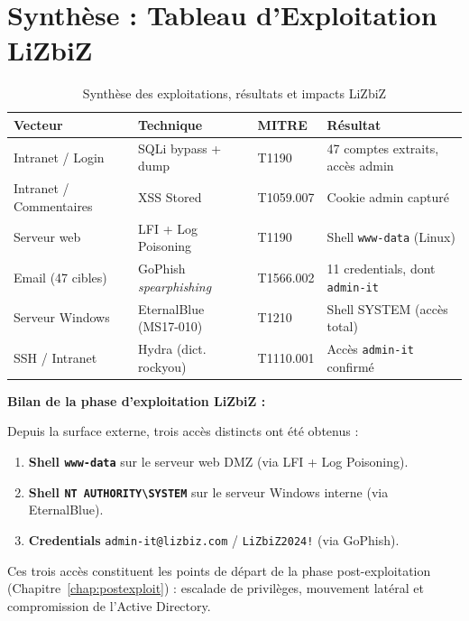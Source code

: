 \section{Synthèse : Tableau d'Exploitation LiZbiZ}
\label{sec:synthese_exploit}

\begin{table}[htbp]
\centering
\caption{Synthèse des exploitations, résultats et impacts LiZbiZ}
\label{tab:synthese_exploit}
\begin{tabular}{p{2.5cm}p{3cm}p{3cm}p{4.5cm}}
\toprule
\textbf{Vecteur} & \textbf{Technique} & \textbf{MITRE} & \textbf{Résultat} \\
\midrule
Intranet / Login
    & SQLi bypass + dump
    & T1190
    & 47 comptes extraits, accès admin \\
\addlinespace
Intranet / Commentaires
    & XSS Stored
    & T1059.007
    & Cookie admin capturé \\
\addlinespace
Serveur web
    & LFI + Log Poisoning
    & T1190
    & Shell \texttt{www-data} (Linux) \\
\addlinespace
Email (47 cibles)
    & GoPhish \textit{spearphishing}
    & T1566.002
    & 11 credentials, dont \texttt{admin-it} \\
\addlinespace
Serveur Windows
    & EternalBlue (MS17-010)
    & T1210
    & Shell SYSTEM (accès total) \\
\addlinespace
SSH / Intranet
    & Hydra (dict. rockyou)
    & T1110.001
    & Accès \texttt{admin-it} confirmé \\
\bottomrule
\end{tabular}
\end{table}

\begin{boxlizbiz}
\textbf{Bilan de la phase d'exploitation LiZbiZ :}

Depuis la surface externe, trois accès distincts ont été obtenus :
\begin{enumerate}
    \item \textbf{Shell \texttt{www-data}} sur le serveur web DMZ
          (via LFI + Log Poisoning).
    \item \textbf{Shell \texttt{NT AUTHORITY\textbackslash{}SYSTEM}}
          sur le serveur Windows interne (via EternalBlue).
    \item \textbf{Credentials} \texttt{admin-it@lizbiz.com} /
          \texttt{LiZbiZ2024!} (via GoPhish).
\end{enumerate}
Ces trois accès constituent les points de départ de la phase
post-exploitation (Chapitre~\ref{chap:postexploit}) : escalade de
privilèges, mouvement latéral et compromission de l'Active Directory.
\end{boxlizbiz}


